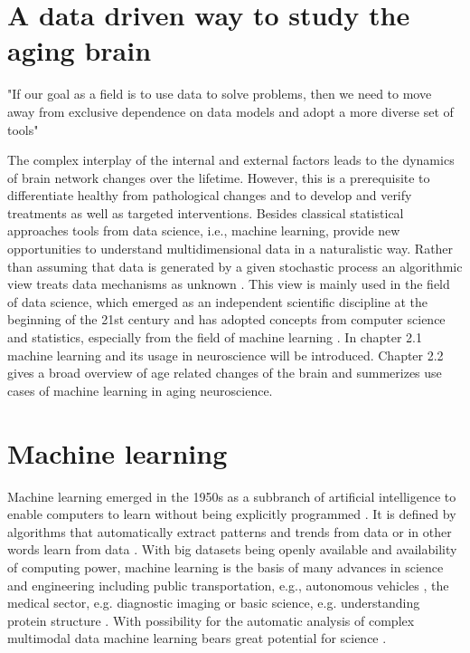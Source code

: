 \section{A data driven way to study the aging brain}
"If our goal as a field is to use data to solve problems, then we need to move away from exclusive dependence on data models and adopt a more diverse set of tools" \cite{Breiman2001}

The complex interplay of the internal and external factors leads to the dynamics of brain network changes over the lifetime. However, this is a prerequisite to differentiate healthy from pathological changes and to develop and verify treatments as well as targeted interventions. Besides classical statistical approaches tools from data science, i.e., machine learning, provide new opportunities to understand multidimensional data in a naturalistic way. Rather than assuming that data is generated by a given stochastic process an algorithmic view treats data mechanisms as unknown \cite{Breiman2001}. This view is mainly used in the field of data science, which emerged as an independent scientific discipline at the beginning of the 21st century and has adopted concepts from computer science and statistics, especially from the field of machine learning \cite{Nylen2013}. In chapter 2.1 machine learning and its usage in neuroscience will be introduced. Chapter 2.2 gives a broad overview of age related changes of the brain and summerizes use cases of machine learning in aging neuroscience.     

\section{Machine learning}
Machine learning emerged in the 1950s as a subbranch of artificial intelligence to enable computers to learn without being explicitly programmed \cite{Samual1959}. It is defined by algorithms that automatically extract patterns and trends from data or in other words learn from data \cite{Hastie2009}. With big datasets being openly available and availability of computing power, machine learning is the basis of many advances in science and engineering including public transportation, e.g., autonomous vehicles \cite{Leonard2020}, the medical sector, e.g. diagnostic imaging \cite{Liu2020} or basic science, e.g. understanding protein structure \cite{Jumper2021}. With possibility for the automatic analysis of complex multimodal data machine learning bears great potential for science \cite{Brunton2019}. 

